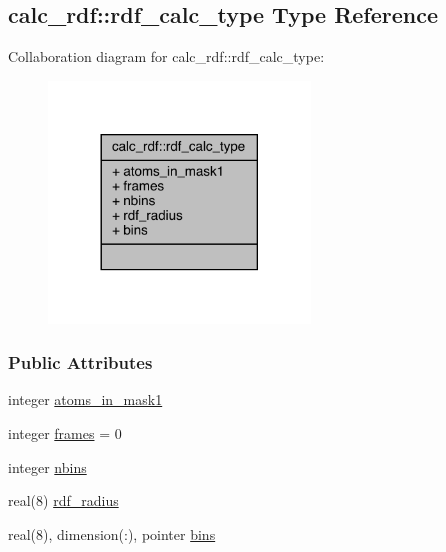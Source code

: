 \hypertarget{structcalc__rdf_1_1rdf__calc__type}{\subsection{calc\-\_\-rdf\-:\-:rdf\-\_\-calc\-\_\-type Type Reference}
\label{structcalc__rdf_1_1rdf__calc__type}
}


Collaboration diagram for calc\-\_\-rdf\-:\-:rdf\-\_\-calc\-\_\-type\-:
\nopagebreak
\begin{figure}[H]
\begin{center}
\leavevmode
\includegraphics[width=197pt]{structcalc__rdf_1_1rdf__calc__type__coll__graph}
\end{center}
\end{figure}
\subsubsection*{Public Attributes}
\begin{DoxyCompactItemize}
\item 
integer \hyperlink{structcalc__rdf_1_1rdf__calc__type_af3686b01b44f3856a2e29100aca3072a}{atoms\-\_\-in\-\_\-mask1}
\item 
integer \hyperlink{structcalc__rdf_1_1rdf__calc__type_ac6bd6ce989b6106d94b1bbbe473dbc5d}{frames} = 0
\item 
integer \hyperlink{structcalc__rdf_1_1rdf__calc__type_a05dc09556fe6b8243420b6485640f6f2}{nbins}
\item 
real(8) \hyperlink{structcalc__rdf_1_1rdf__calc__type_ad999d26c37652329859cdb441ba0a998}{rdf\-\_\-radius}
\item 
real(8), dimension(\-:), pointer \hyperlink{structcalc__rdf_1_1rdf__calc__type_aae2e9f8a47201e280073cdaa01deb044}{bins}
\end{DoxyCompactItemize}


